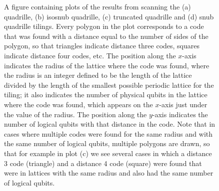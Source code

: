 \documentclass{amsbook}
\theoremstyle{plain}
\theoremstyle{definition}
\theoremstyle{remark}
\begin{document}
\begin{figure}
\caption{
\label{figure:results-quadrille}
A figure containing plots of the results from scanning the (a) quadrille, (b) isosnub quadrille, (c) truncated quadrille and (d) snub quadrille tilings.  Every polygon in the plot corresponds to a code that was found with a distance equal to the number of sides of the polygon, so that triangles indicate distance three codes, squares indicate distance four codes, etc.  The position along the $x$-axis indicates the radius of the lattice where the code was found, where the radius is an integer defined to be the length of the lattice divided by the length of the smallest possible periodic lattice for the tiling;  it also indicates the number of physical qubits in the lattice where the code was found, which appears on the $x$-axis just under the value of the radius.  The position along the $y$-axis indicates the number of logical qubits with that distance in the code.
Note that in cases where multiple codes were found for the same radius and with the same number of logical qubits, multiple polygons are drawn, so that for example in plot (c) we see several cases in which a distance 3 code (triangle) and a distance 4 code (square) were found that were in lattices with the same radius and also had the same number of logical qubits.
}
\end{figure}
\end{document}
